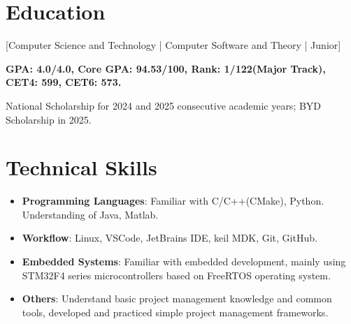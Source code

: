 \documentclass{resume}
\begin{document}


\ResumeTitle

\section{Education}
[\textnormal{Computer Science and Technology | Computer Software and Theory | Junior}]

\textbf{GPA: 4.0/4.0, Core GPA: 94.53/100, Rank: 1/122(Major Track), CET4: 599, CET6: 573.}

National Scholarship for 2024 and 2025 consecutive academic years; BYD Scholarship in 2025.

\section[Technical Skills]{Technical Skills}
\begin{itemize}
  \item \textbf{Programming Languages}: Familiar with C/C++(CMake), Python. Understanding of Java, Matlab.
  \item \textbf{Workflow}: Linux, VSCode, JetBrains IDE, keil MDK, Git, GitHub.
  \item \textbf{Embedded Systems}: Familiar with embedded development, mainly using STM32F4 series microcontrollers based on FreeRTOS operating system.
  \item \textbf{Others}: Understand basic project management knowledge and common tools, developed and practiced simple project management frameworks.
\end{itemize}
\end{document}
